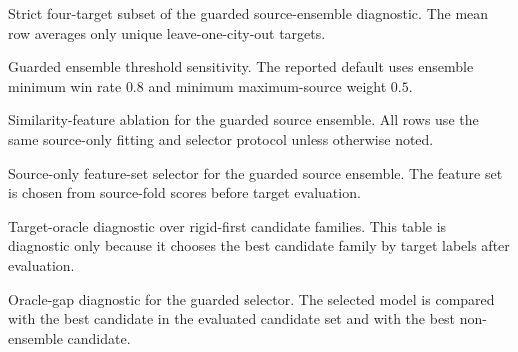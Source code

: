 \begin{table}[h]
\centering
\scriptsize
\resizebox{\textwidth}{!}{}
\caption{Strict four-target subset of the guarded source-ensemble diagnostic. The mean row averages only unique leave-one-city-out targets.}
\label{tab:guarded-strict-loo}
\end{table}

\begin{table}[h]
\centering
\scriptsize
\resizebox{\textwidth}{!}{}
\caption{Guarded ensemble threshold sensitivity. The reported default uses ensemble minimum win rate $0.8$ and minimum maximum-source weight $0.5$.}
\label{tab:guarded-threshold}
\end{table}

\begin{table}[h]
\centering
\scriptsize
\resizebox{\textwidth}{!}{}
\caption{Similarity-feature ablation for the guarded source ensemble. All rows use the same source-only fitting and selector protocol unless otherwise noted.}
\label{tab:guarded-feature-ablation}
\end{table}

\begin{table}[h]
\centering
\scriptsize
\resizebox{\textwidth}{!}{}
\caption{Source-only feature-set selector for the guarded source ensemble. The feature set is chosen from source-fold scores before target evaluation.}
\label{tab:guarded-source-feature}
\end{table}

\begin{table}[h]
\centering
\scriptsize
\resizebox{\textwidth}{!}{}
\caption{Target-oracle diagnostic over rigid-first candidate families. This table is diagnostic only because it chooses the best candidate family by target labels after evaluation.}
\label{tab:guarded-candidate-family}
\end{table}

\begin{table}[h]
\centering
\scriptsize
\resizebox{\textwidth}{!}{}
\caption{Oracle-gap diagnostic for the guarded selector. The selected model is compared with the best candidate in the evaluated candidate set and with the best non-ensemble candidate.}
\label{tab:guarded-oracle-gap}
\end{table}

